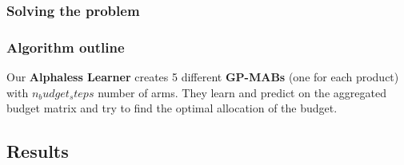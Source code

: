 \begin{frame}

\frametitle{Solving the problem}


\end{frame}


\begin{frame}

\frametitle{Algorithm outline}

Our \textbf{Alphaless Learner} creates 5 different \textbf{GP-MABs} (one for each product) with $n_budget_steps$ number of arms.
They learn and predict on the aggregated budget matrix and try to find the optimal allocation of the budget.


\end{frame}


\subsection{Results}


\begin{frame}

\frametitle{}
\framesubtitle{}


\end{frame}

